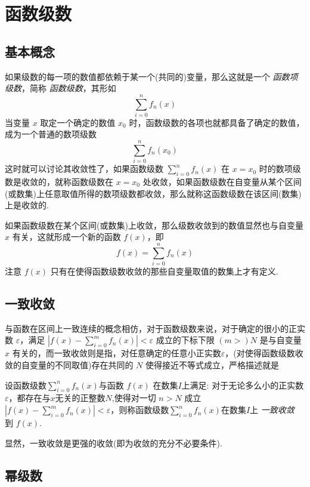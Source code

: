 
\section{函数级数}
\label{sec:function-series}

\subsection{基本概念}
\label{sec:concept-of-function-series}


如果级数的每一项的数值都依赖于某一个(共同的)变量，那么这就是一个 \emph{函数项级数}，简称 \emph{函数级数}，其形如
\[ \sum_{i=0}^n f_n(x) \]
当变量 $x$ 取定一个确定的数值 $x_0$ 时，函数级数的各项也就都具备了确定的数值，成为一个普通的数项级数
\[ \sum_{i=0}^n f_n(x_{0}) \]
这时就可以讨论其收敛性了，如果函数级数 $\sum_{i=0}^n f_n(x)$ 在 $x=x_0$ 时的数项级数是收敛的，就称函数级数在 $x=x_0$ 处收敛，如果函数级数在自变量从某个区间(或数集)上任意取值所得的数项级数都收敛，那么就称这函数级数在该区间(数集)上是收敛的.

如果函数级数在某个区间(或数集)上收敛，那么级数收敛到的数值显然也与自变量 $x$ 有关，这就形成一个新的函数 $f(x)$，即
\[ f(x) = \sum_{i=0}^n f_n(x) \]
注意 $f(x)$ 只有在使得函数级数收敛的那些自变量取值的数集上才有定义.

\subsection{一致收敛}
\label{sec:uniform-convergence}

与函数在区间上一致连续的概念相仿，对于函数级数来说，对于确定的很小的正实数 $\varepsilon$，满足 $|f(x) - \sum_{i=0}^m f_n(x)|<\varepsilon$ 成立的下标下限 $(m>)N$ 是与自变量 $x$ 有关的，而一致收敛则是指，对任意确定的任意小正实数$\varepsilon$，(对使得函数级数收敛的自变量的不同取值)存在共同的 $N$ 使得接近不等式成立，严格描述就是
\begin{definition}
  \label{uniform-convergence-of-function-series}
  设函数级数$\sum_{i=0}^n f_n(x)$与函数 $f(x)$ 在数集$I$上满足: 对于无论多么小的正实数 $\varepsilon$，都存在与$x$无关的正整数$N$,使得对一切 $n>N$ 成立 $|f(x) - \sum_{i=0}^m f_n(x)|<\varepsilon$，则称函数级数$\sum_{i=0}^n f_n(x)$在数集$I$上 \emph{一致收敛} 到 $f(x)$.
\end{definition}

显然，一致收敛是更强的收敛(即为收敛的充分不必要条件).


\subsection{幂级数}
\label{sec:power-series}

